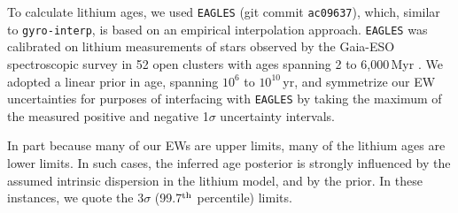 \documentclass[11pt,twocolumn,tighten,linenumbers]{aastex63}
\newcommand{\nkeplerstars}{$\approx$160{,}000}
\begin{document}
To calculate lithium ages, we used \texttt{EAGLES} (git commit
\texttt{ac09637}), which, similar to \texttt{gyro-interp}, is based on
an empirical interpolation approach.  \texttt{EAGLES} 
was calibrated on lithium measurements of stars observed by the
Gaia-ESO spectroscopic survey in 52 open clusters with ages spanning 2
to 6{,}000\,Myr \citep{Jeffries_2023}.  We adopted a linear prior in
age, spanning $10^6$ to $10^{10}$\,yr, and symmetrize our EW
uncertainties for purposes of interfacing with \texttt{EAGLES} by
taking the maximum of the measured positive and negative 1$\sigma$
uncertainty intervals.

In part because many of our EWs are upper limits, many of the lithium
ages are lower limits.  In such cases,  the inferred age posterior is
strongly influenced by the assumed intrinsic dispersion in
the lithium model, and by the prior.  In these instances, we
quote the 3$\sigma$ (99.7$^{\rm th}$ percentile) limits.


%
%
%
\end{document}
